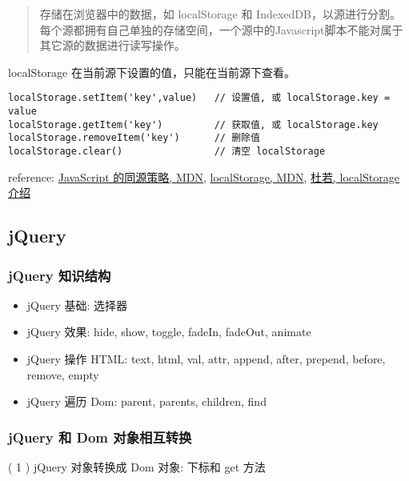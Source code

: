 \begin{quote}
存储在浏览器中的数据，如 localStorage 和 IndexedDB，以源进行分割。每个源都拥有自己单独的存储空间，一个源中的Javascript脚本不能对属于其它源的数据进行读写操作。
\end{quote}

localStorage 在当前源下设置的值，只能在当前源下查看。

\begin{verbatim}localStorage.setItem('key',value)   // 设置值, 或 localStorage.key = value
localStorage.getItem('key')         // 获取值, 或 localStorage.key
localStorage.removeItem('key')      // 删除值
localStorage.clear()                // 清空 localStorage
\end{verbatim}

reference: \href{https://developer.mozilla.org/zh-CN/docs/Web/Security/Same-origin\_policy}{JavaScript 的同源策略, MDN}, \href{https://developer.mozilla.org/en-US/docs/Web/API/Storage/LocalStorage}{localStorage, MDN}, \href{http://wikieswan.github.io/javascript/2015/04/03/html5-api-localstorage/}{杜若, localStorage 介绍}

\subsection{jQuery}\hypertarget{jquery}{}\label{jquery}

\subsubsection{jQuery 知识结构}\hypertarget{jquery-}{}\label{jquery-}

\begin{itemize}
\item jQuery 基础: 选择器
\item jQuery 效果: hide, show, toggle, fadeIn, fadeOut, animate
\item jQuery 操作 HTML: text, html, val, attr, append, after, prepend, before, remove, empty
\item jQuery 遍历 Dom: parent, parents, children, find
\end{itemize}

\subsubsection{jQuery 和 Dom 对象相互转换}\hypertarget{jquery--dom-}{}\label{jquery--dom-}

( 1 ) jQuery 对象转换成 Dom 对象: 下标和 get 方法

